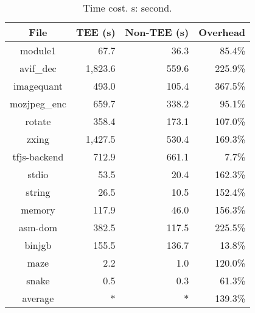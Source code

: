 


\begin{table}[htbp]
\centering
\caption{Time cost. s: second.}\label{tab:time}
\begin{tabular}{c r r r}
\toprule
\textbf{File} & \textbf{TEE (s)} & \textbf{Non-TEE (s)} & \textbf{Overhead} \\
\midrule

module1 & 67.7 & 36.3 & 85.4\% \\

avif\_dec & 1,823.6 & 559.6 & 225.9\% \\

imagequant & 493.0 & 105.4 & 367.5\% \\

mozjpeg\_enc & 659.7 & 338.2 & 95.1\% \\

rotate & 358.4 & 173.1 & 107.0\% \\

zxing & 1,427.5 & 530.4 & 169.3\% \\

tfjs-backend & 712.9 & 661.1 & 7.7\% \\

stdio & 53.5 & 20.4 & 162.3\% \\

string & 26.5 & 10.5 & 152.4\% \\

memory & 117.9 & 46.0 & 156.3\% \\

asm-dom & 382.5 & 117.5 & 225.5\% \\

binjgb & 155.5 & 136.7 & 13.8\% \\

maze & 2.2 & 1.0 & 120.0\%\\

snake & 0.5 & 0.3 & 61.3\%\\

\midrule
average & $\ast$ & $\ast$ & 139.3\% \\

%
%
%
%
%
%
%
%
%
%
%

\bottomrule
\end{tabular}
\end{table}
